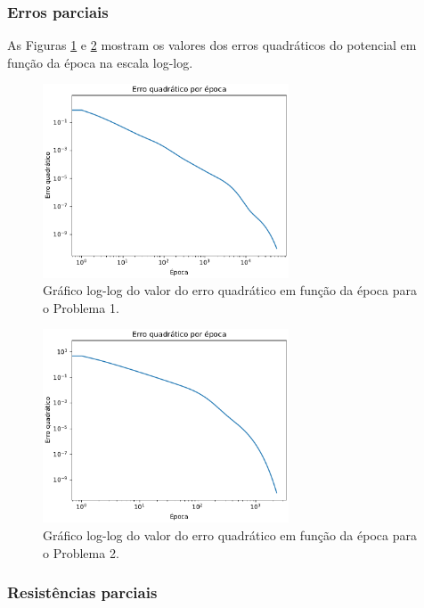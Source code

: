 \documentclass{aleph-revista}
\begin{document}
\subsubsection{Erros parciais}

As Figuras \ref{fig:erro_p1} e \ref{fig:erro_p2} mostram os valores dos erros quadráticos do potencial em função da época na escala log-log.

\begin{figure}[!ht]
  \centering
  \includegraphics[width=0.65\textwidth]{p1_hist}
  \caption{Gráfico log-log do valor do erro quadrático em função da época para o Problema 1.}
  \label{fig:erro_p1}
\end{figure}

\begin{figure}[!ht]
  \centering
  \includegraphics[width=0.65\textwidth]{p2_hist}
  \caption{Gráfico log-log do valor do erro quadrático em função da época para o Problema 2.}
  \label{fig:erro_p2}
\end{figure}


\subsubsection{Resistências parciais}
\end{document}

